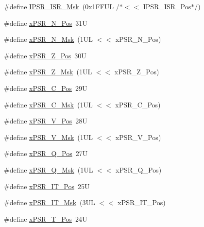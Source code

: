 \begin{DoxyCompactItemize}
\item 
\#define \mbox{\hyperlink{group__CMSIS__CORE_gaf013a4579a64d1f21f56ea9f1b33ab56}{I\+P\+S\+R\+\_\+\+I\+S\+R\+\_\+\+Msk}}~(0x1\+F\+F\+U\+L /$\ast$$<$$<$ I\+P\+S\+R\+\_\+\+I\+S\+R\+\_\+\+Pos$\ast$/)
\item 
\#define \mbox{\hyperlink{group__CMSIS__CORE_ga031eb1b8ebcdb3d602d0b9f2ec82a7ae}{x\+P\+S\+R\+\_\+\+N\+\_\+\+Pos}}~31U
\item 
\#define \mbox{\hyperlink{group__CMSIS__CORE_gaf600f4ff41b62cf2f3b0a59b6d2e93d6}{x\+P\+S\+R\+\_\+\+N\+\_\+\+Msk}}~(1\+U\+L $<$$<$ x\+P\+S\+R\+\_\+\+N\+\_\+\+Pos)
\item 
\#define \mbox{\hyperlink{group__CMSIS__CORE_ga5869dd608eea73c80f0567d781d2230b}{x\+P\+S\+R\+\_\+\+Z\+\_\+\+Pos}}~30U
\item 
\#define \mbox{\hyperlink{group__CMSIS__CORE_ga907599209fba99f579778e662021c4f2}{x\+P\+S\+R\+\_\+\+Z\+\_\+\+Msk}}~(1\+U\+L $<$$<$ x\+P\+S\+R\+\_\+\+Z\+\_\+\+Pos)
\item 
\#define \mbox{\hyperlink{group__CMSIS__CORE_ga14adb79b91f6634b351a1b57394e2db6}{x\+P\+S\+R\+\_\+\+C\+\_\+\+Pos}}~29U
\item 
\#define \mbox{\hyperlink{group__CMSIS__CORE_ga21e2497255d380f956ca0f48d11d0775}{x\+P\+S\+R\+\_\+\+C\+\_\+\+Msk}}~(1\+U\+L $<$$<$ x\+P\+S\+R\+\_\+\+C\+\_\+\+Pos)
\item 
\#define \mbox{\hyperlink{group__CMSIS__CORE_gae0cfbb394490db402623d97e6a979e00}{x\+P\+S\+R\+\_\+\+V\+\_\+\+Pos}}~28U
\item 
\#define \mbox{\hyperlink{group__CMSIS__CORE_gab07f94ed3b6ee695f5af719dc27995c2}{x\+P\+S\+R\+\_\+\+V\+\_\+\+Msk}}~(1\+U\+L $<$$<$ x\+P\+S\+R\+\_\+\+V\+\_\+\+Pos)
\item 
\#define \mbox{\hyperlink{group__CMSIS__CORE_gaabb4178d50676a8f19cf8f727f38ace8}{x\+P\+S\+R\+\_\+\+Q\+\_\+\+Pos}}~27U
\item 
\#define \mbox{\hyperlink{group__CMSIS__CORE_ga133ac393c38559ae43ac36383e731dd4}{x\+P\+S\+R\+\_\+\+Q\+\_\+\+Msk}}~(1\+U\+L $<$$<$ x\+P\+S\+R\+\_\+\+Q\+\_\+\+Pos)
\item 
\#define \mbox{\hyperlink{group__CMSIS__CORE_gac5be1db1343f776ecd00f0a4ebe70a46}{x\+P\+S\+R\+\_\+\+I\+T\+\_\+\+Pos}}~25U
\item 
\#define \mbox{\hyperlink{group__CMSIS__CORE_ga6dc177aab488851bb3b98cf4b420141a}{x\+P\+S\+R\+\_\+\+I\+T\+\_\+\+Msk}}~(3\+U\+L $<$$<$ x\+P\+S\+R\+\_\+\+I\+T\+\_\+\+Pos)
\item 
\#define \mbox{\hyperlink{group__CMSIS__CORE_ga98d801da9a49cda944f52aeae104dd38}{x\+P\+S\+R\+\_\+\+T\+\_\+\+Pos}}~24U

\end{DoxyCompactItemize}
